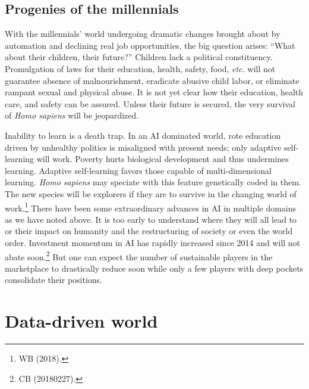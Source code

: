 \begin{multicols}{2}
\subsection{Progenies of the millennials}

With the millennials' world undergoing dramatic changes brought about by automation and declining real job opportunities, the big question arises: “What about their children, their future?” Children lack a political constituency. Promulgation of laws for their education, health, safety, food, \textit{etc.} will not guarantee absence of malnourishment, eradicate abusive child labor, or eliminate rampant sexual and physical abuse. It is not yet clear how their education, health care, and safety can be assured. Unless their future is secured, the very survival of \textit{Homo sapiens} will be jeopardized.

Inability to learn is a death trap. In an AI dominated world, rote education driven by unhealthy politics is misaligned with present needs; only adaptive self-learning will work. Poverty hurts biological development and thus undermines learning. Adaptive self-learning favors those capable of multi-dimensional learning. \textit{Homo sapiens} may speciate with this feature genetically coded in them. The new species will be explorers if they are to survive in the changing world of work.\footnote{WB (2018).} There have been some extraordinary advances in AI in multiple domains as we have noted above. It is too early to understand where they will all lead to or their impact on humanity and the restructuring of society or even the world order. Investment momentum in AI has rapidly increased since 2014 and will not abate soon.\footnote{CB (20180227).}  But one can expect the number of sustainable players in the marketplace to drastically reduce soon while only a few players with deep pockets consolidate their positions.\\[-24pt]

\section{Data-driven world}

\vskip -4pt



\end{multicols}
